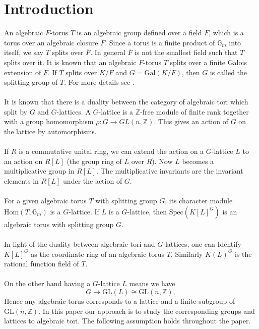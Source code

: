 \documentclass{article}
\theoremstyle{plain}
\theoremstyle{definition}
\newcommand{\Z}{\ensuremath{\mathbb{Z}}}
\begin{document}
\section{Introduction}
An algebraic $F$-torus $T$ is an algebraic group defined over a field $F$, which is a torus over an algebraic closure $\bar{F}$. Since a torus is a finite product of $\mathbb{G}_m$ into itself, we say $T$ splits over $\bar{F}$. In general $\bar{F}$ is not the smallest field such that $T$ splits over it. It is known that an algebraic $F$-torus $T$ splits over a finite Galois extension of $F$. If $T$ splits over $K/F$ and $G = \mathrm{Gal}(K/F)$, then $G$ is called the splitting group of $T$. For more details see \cite[Chapter 2]{Voskresenskii}.  \\
\\
It is known that there is a duality between the category of algebraic tori which split by $G$ and $G$-lattices. A $G$-lattice is a $\Z$-free module of finite rank together with a group homomorphism $\rho: G \longrightarrow GL(n,\Z)$. This gives an action of $G$ on the lattice by automorphisms.\\
\\
If $R$ is a commutative unital ring, we can extend the action on a $G$-lattice $L $ to an action on $R[L]$ (the group ring of $L$ over $R$). Now $L$ becomes a multiplicative group in $R[L]$. The multiplicative invariants are the invariant elements in $R[L]$ under the action of $G$. \\
\\
For a given algebraic torus $T$ with splitting group $G$, its character module $\mathrm{Hom}(T,\mathbb{G}_m)$ is a $G$-lattice. If $L$ is a $G$-lattice, then $\mathrm{Spec}(K[L]^G)$ is an algebraic torus with splitting group $G$.\\
 \\
In light of the duality between algebraic tori and $G$-lattices, one can Identify $K[L]^G$ as the coordinate ring of an algebraic torus $T$. Similarly $K(L)^G$ is the rational function field of $T$.\\
\\
On the other hand having a $G$-lattice $L$ means we have  
$$
G \longrightarrow \mathrm{GL}(L) \cong \mathrm{GL}(n,\mathbb{Z}),
$$
Hence any algebraic torus corresponds to a lattice and a finite subgroup of $\mathrm{GL}(n,\Z)$. In this paper our approach is to study the corresponding groups and lattices to algebraic tori. The following assumption holds throughout the paper.
\end{document}
